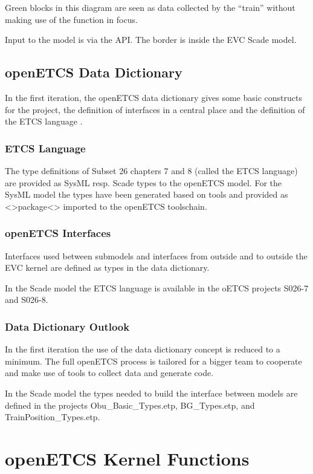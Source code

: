 \documentclass{template/openetcs_report}
\begin{document}
Green blocks in this diagram are seen as data collected by the ``train'' without making use of the function in focus.

Input to the model is via the API. The border is inside the EVC Scade model. 

\section{openETCS Data Dictionary}
In the first iteration, the openETCS data dictionary gives some basic constructs for the project, the definition of interfaces in a central place and the definition of the ETCS language \cite{dataDictionary}.

\subsection{ETCS Language}
The type definitions of Subset 26 chapters 7 and 8 (called the ETCS language) are provided as SysML resp. Scade types to the openETCS model. For the SysML model the types have been generated based on tools and provided as <>package<> imported to the openETCS toolschain.



\subsection{openETCS Interfaces}
Interfaces used between submodels and interfaces from outside and to outside the EVC kernel are defined as types in the data dictionary.

In the Scade model the ETCS language is available in the oETCS projects S026-7 and S026-8.

\subsection{Data Dictionary Outlook}
In the first iteration the use of the data dictionary concept is reduced to a minimum. The full openETCS process is tailored for a bigger team to cooperate and make use of tools to collect data and generate code. 

In the Scade model the types needed to build the interface between models are defined in the projects Obu\_Basic\_Types.etp, BG\_Types.etp, and TrainPosition\_Types.etp.


\chapter{openETCS Kernel Functions}
\end{document}
